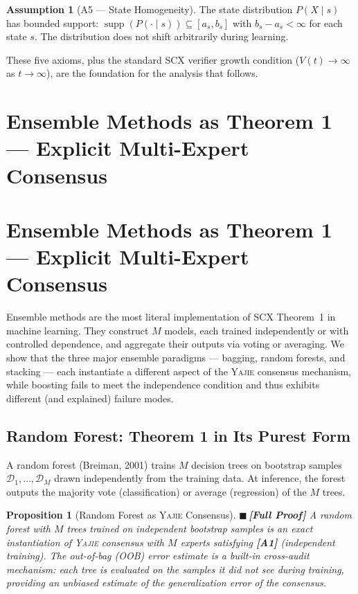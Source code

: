 \documentclass[12pt,a4paper]{article}
\newtheorem{proposition}[theorem]{Proposition}
\theoremstyle{definition}
\newtheorem{assumption}[theorem]{Assumption}
\newcommand{\rigorFull}{{\color{rigorcolor}$\blacksquare$\,\textbf{[Full Proof]}}}
\newcommand{\Yajie}{\textsc{Yajie}}
\newcommand{\SCX}{\textsc{SCX}}
\DeclareMathOperator{\supp}{supp}
\newcommand{\cD}{\mathcal{D}}
\newcommand{\asmTag}[1]{\textsf{\textbf{[A#1]}}}
\begin{document}
\begin{assumption}[A5 — State Homogeneity]\label{asm:A5}
The state distribution $P(X \mid s)$ has bounded support: $\supp(P(\cdot \mid s)) \subseteq [a_s, b_s]$ with $b_s - a_s < \infty$ for each state $s$. The distribution does not shift arbitrarily during learning.
\end{assumption}

These five axioms, plus the standard \SCX{} verifier growth condition ($V(t) \to \infty$ as $t \to \infty$), are the foundation for the analysis that follows.

\section{Ensemble Methods as Theorem 1 — Explicit Multi-Expert Consensus}
\section{Ensemble Methods as Theorem 1 --- Explicit Multi-Expert Consensus}
\label{sec:ensemble}

Ensemble methods are the most literal implementation of \SCX{} Theorem~1 in machine learning. They construct $M$ models, each trained independently or with controlled dependence, and aggregate their outputs via voting or averaging. We show that the three major ensemble paradigms — bagging, random forests, and stacking — each instantiate a different aspect of the \Yajie{} consensus mechanism, while boosting fails to meet the independence condition and thus exhibits different (and explained) failure modes.

\subsection{Random Forest: Theorem 1 in Its Purest Form}

A random forest (Breiman, 2001) trains $M$ decision trees on bootstrap samples $\cD_1, \ldots, \cD_M$ drawn independently from the training data. At inference, the forest outputs the majority vote (classification) or average (regression) of the $M$ trees.

\begin{proposition}[Random Forest as \Yajie{} Consensus]\label{prop:rf_yajie}
\rigorFull
A random forest with $M$ trees trained on independent bootstrap samples is an exact instantiation of \Yajie{} consensus with $M$ experts satisfying \asmTag{1} (independent training). The out-of-bag (OOB) error estimate is a built-in cross-audit mechanism: each tree is evaluated on the samples it did not see during training, providing an unbiased estimate of the generalization error of the consensus.
\end{proposition}
\end{document}
